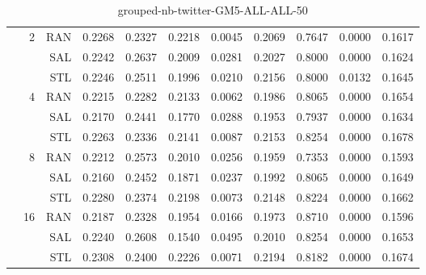 \begin{center}
\begin{table}[htbp]
\begin{center}
\begin{tabular}{ | r | r | r | r | r | r | r | r | r | r | r |}
 & \multirow{3}{*}{2} & RAN & 0.2268 & 0.2327 & 0.2218 & 0.0045 & 0.2069 & 0.7647 & 0.0000 & 0.1617\\ \cline{3-11}
 &   & SAL & 0.2242 & 0.2637 & 0.2009 & 0.0281 & 0.2027 & 0.8000 & 0.0000 & 0.1624\\ \cline{3-11}
 &   & STL & 0.2246 & 0.2511 & 0.1996 & 0.0210 & 0.2156 & 0.8000 & 0.0132 & 0.1645\\ \cline{2-11}
 & \multirow{3}{*}{4} & RAN & 0.2215 & 0.2282 & 0.2133 & 0.0062 & 0.1986 & 0.8065 & 0.0000 & 0.1654\\ \cline{3-11}
 &   & SAL & 0.2170 & 0.2441 & 0.1770 & 0.0288 & 0.1953 & 0.7937 & 0.0000 & 0.1634\\ \cline{3-11}
 &   & STL & 0.2263 & 0.2336 & 0.2141 & 0.0087 & 0.2153 & 0.8254 & 0.0000 & 0.1678\\ \cline{2-11}
 & \multirow{3}{*}{8} & RAN & 0.2212 & 0.2573 & 0.2010 & 0.0256 & 0.1959 & 0.7353 & 0.0000 & 0.1593\\ \cline{3-11}
 &   & SAL & 0.2160 & 0.2452 & 0.1871 & 0.0237 & 0.1992 & 0.8065 & 0.0000 & 0.1649\\ \cline{3-11}
 &   & STL & 0.2280 & 0.2374 & 0.2198 & 0.0073 & 0.2148 & 0.8224 & 0.0000 & 0.1662\\ \cline{2-11}
 & \multirow{3}{*}{16} & RAN & 0.2187 & 0.2328 & 0.1954 & 0.0166 & 0.1973 & 0.8710 & 0.0000 & 0.1596\\ \cline{3-11}
 &   & SAL & 0.2240 & 0.2608 & 0.1540 & 0.0495 & 0.2010 & 0.8254 & 0.0000 & 0.1653\\ \cline{3-11}
 &   & STL & 0.2308 & 0.2400 & 0.2226 & 0.0071 & 0.2194 & 0.8182 & 0.0000 & 0.1674\\ \cline{2-11}
\hline
\end{tabular}
\caption{grouped-nb-twitter-GM5-ALL-ALL-50}
\end{center}
 \end{table}
\end{center}

